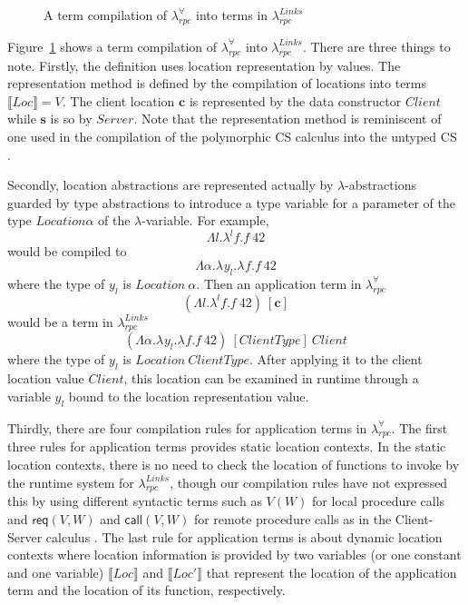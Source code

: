 \documentclass[a4paper]{article}
\theoremstyle{plain}
\theoremstyle{definition}
\newcommand{\rulewidth}{.8\linewidth}
\newcommand{\ruleverticalsephalf}{0.25cm}
\newcommand{\ruleverticalsep}{0.5cm}
\newcommand{\polyrpc}{$\lambda_{rpc}^{\forall}$\xspace}
\newcommand{\linksrpc}{$\lambda_{rpc}^{Links}$\xspace}
\newcommand{\client}{\textbf{c}}
\newcommand{\server}{\textbf{s}}
\newcommand{\lamL}[3]{\lambda^{#1}#2.#3}
\newcommand{\subst}[2]{\{#1/#2\}}
\newcommand{\textsfReq}{\textsf{req}}
\newcommand{\req}[2]{\textsfReq(#1,#2)}
\newcommand{\textsfCall}{\textsf{call}}
\newcommand{\call}[2]{\textsfCall(#1,#2)}
\newcommand{\tyenv}{\Gamma}
\newcommand{\judgcomp}[2]{\llbracket#1\rrbracket_{#2}}
\newcommand{\loctycomp}[1]{L\llbracket#1\rrbracket}
\newcommand{\polytycomp}[1]{T\llbracket#1\rrbracket}
\newcommand{\anncomp}[1]{Ann\llbracket#1\rrbracket}
\newcommand{\loctmcomp}[1]{\llbracket#1\rrbracket}
\newcommand{\Loc}{Loc}
\begin{document}
\begin{figure}[t]
\caption{A term compilation of \polyrpc into terms in \linksrpc}
\label{fig:termcompilationback}
\end{figure}

%
Figure~\ref{fig:termcompilationback} shows a term compilation of
\polyrpc into \linksrpc.
%
There are three things to note.
%
Firstly, the definition uses location representation by values.
%
The representation method is defined by the compilation of locations
into terms $\loctmcomp{\Loc}=V$.
%
The client location $\client$ is represented by the data constructor
$Client$ while $\server$ is so by $Server$.
%
Note that the representation method is reminiscent of one used in the
compilation of the polymorphic CS calculus into the untyped CS
\cite{cclr2021}.

%
Secondly, location abstractions are represented actually by
$\lambda$-abstractions guarded by type abstractions to introduce a
type variable for a parameter of the type $Location \alpha$ of the
$\lambda$-variable.
%
For example,
\[
\Lambda l.\lamL{l}{f}{f \ 42}
\]
would be compiled to
\[
\Lambda\alpha.\lamL{}{y_l}{\lamL{}{f}{f \ 42}}
\]
where the type of
$y_l$ is $Location \ \alpha$.
%
Then an application term in \polyrpc
\[
(\Lambda l.\lamL{l}{f}{f \ 42}) \ [\client]
\]
would be a term in \linksrpc
\[
(\Lambda\alpha.\lamL{}{y_l}{\lamL{}{f}{f \ 42}}) \ [ClientType]
\ Client
\]
where the type of $y_l$ is $Location \ ClientType$.
%
After applying it to the client location value $Client$, this location
can be examined in runtime through a variable $y_l$ bound to the
location representation value.

%
Thirdly, there are four compilation rules for application terms in
\polyrpc.
%
The first three rules for application terms provides static location
contexts.
%
In the static location contexts, there is no need to check the
location of functions to invoke by the runtime system for \linksrpc,
though our compilation rules have not expressed this by using
different syntactic terms such as $V(W)$ for local procedure calls and
$\req{V}{W}$ and $\call{V}{W}$ for remote procedure calls as in the
Client-Server calculus \cite{cclr2021}.
%
The last rule for application terms is about dynamic location contexts
where location information is provided by two variables (or one
constant and one variable) $\loctmcomp{\Loc}$ and $\loctmcomp{\Loc'}$
that represent the location of the application term and the location
of its function, respectively.
\end{document}
